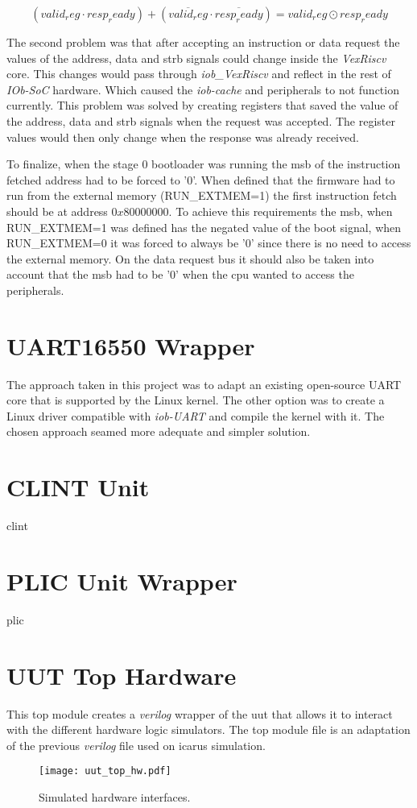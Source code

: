 \begin{equation}
  (valid_reg \cdot resp_ready) + (\overline{valid_reg} \cdot \overline{resp_ready}) = valid_reg \odot resp_ready
  \label{eq:simple_logic_eq}
\end{equation}

The second problem was that after accepting an instruction or data request the values of the address, data and strb signals could change inside the \textit{VexRiscv} core. This changes would pass through \textit{iob\_VexRiscv} and reflect in the rest of \textit{IOb-SoC} hardware. Which caused the \textit{iob-cache} and peripherals to not function currently. This problem was solved by creating registers that saved the value of the address, data and strb signals when the request was accepted. The register values would then only change when the response was already received. 

To finalize, when the stage 0 bootloader was running the \acrfull{msb} of the instruction fetched address had to be forced to '0'. When defined that the firmware had to run from the external memory (RUN\_EXTMEM=1) the first instruction fetch should be at address $0x80000000$. To achieve this requirements the \acrfull{msb}, when RUN\_EXTMEM=1 was defined has the negated value of the boot signal, when RUN\_EXTMEM=0 it was forced to always be '0' since there is no need to access the external memory. On the data request bus it should also be taken into account that the \acrshort{msb} had to be '0' when the \acrshort{cpu} wanted to access the peripherals.

\section{UART16550 Wrapper}
The approach taken in this project was to adapt an existing open-source UART core that is supported by the Linux kernel. The other option was to create a Linux driver compatible with \textit{iob-UART} and compile the kernel with it. The chosen approach seamed more adequate and simpler solution.

\section{CLINT Unit}
\acrshort{clint}

\section{PLIC Unit Wrapper}
\acrshort{plic} 

\section{UUT Top Hardware}
This top module creates a \textit{verilog} wrapper of the \acrfull{uut} that allows it to interact with the different hardware logic simulators. The top module file is an adaptation of the previous \textit{verilog} file used on icarus simulation.

\begin{figure}[!ht]
    \centering
    \texttt{[image: uut\_top\_hw.pdf]}
    \caption{Simulated hardware interfaces.}
    \label{fig:uut_top_hw}
\end{figure}